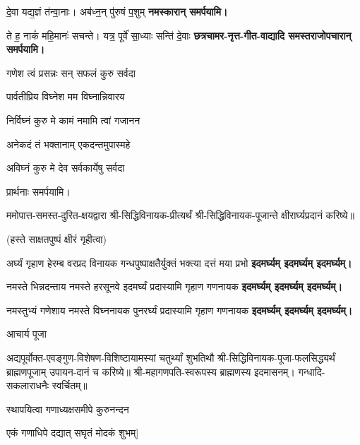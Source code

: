 \begin{center}
{दे॒वा यद्य॒ज्ञं त॑न्वा॒नाः। अब॑ध्न॒न् पु॑रुषं प॒शुम्}
\textbf{\devAya{} नमस्कारान् समर्पयामि।}
\medskip

{ते ह॒ नाकं॑ महि॒मानः॑ सचन्ते। यत्र॒ पूर्वे॑ सा॒ध्याः सन्ति॑ दे॒वाः}
\textbf{\devAya{} छत्रचामर-नृत्त-गीत-वाद्यादि समस्तराजोपचारान् समर्पयामि।}
\medskip

{गणेश त्वं प्रसन्नः सन् सफलं कुरु सर्वदा}

{पार्वतीप्रिय विघ्नेश मम विघ्नान्निवारय}

{निर्विघ्नं कुरु मे कामं नमामि त्वां गजानन}

{अनेकदं तं भक्तानाम् एकदन्तमुपास्महे}

{अविघ्नं कुरु मे देव सर्वकार्येषु सर्वदा}

प्रार्थनाः समर्पयामि।

\resetShloka
ममोपात्त-समस्त-दुरित-क्षयद्वारा श्री-सिद्धिविनायक-प्रीत्यर्थं श्री-सिद्धिविनायक-पूजान्ते क्षीरार्घ्यप्रदानं करिष्ये॥

(हस्ते साक्षतपुष्पं क्षीरं गृहीत्वा)

\twolineshloka
{अर्घ्यं गृहाण हेरम्ब वरप्रद विनायक}
{गन्धपुष्पाक्षतैर्युक्तं भक्त्या दत्तं मया प्रभो}
\textbf{\devAya{} इदमर्घ्यम् इदमर्घ्यम् इदमर्घ्यम्।}

\twolineshloka
{नमस्ते भिन्नदन्ताय नमस्ते हरसूनवे}
{इदमर्घ्यं प्रदास्यामि गृहाण गणनायक}
\textbf{\devAya{} इदमर्घ्यम् इदमर्घ्यम् इदमर्घ्यम्।}

\twolineshloka
{नमस्तुभ्यं गणेशाय नमस्ते विघ्ननायक}
{पुनरर्घ्यं प्रदास्यामि गृहाण गणनायक}
\textbf{\devAya{} इदमर्घ्यम् इदमर्घ्यम् इदमर्घ्यम्।}

\centerline{आचार्य पूजा}

अद्यपूर्वोक्त-एवङ्गुण-विशेषण-विशिष्टायामस्यां चतुर्थ्यां शुभतिथौ श्री-सिद्धिविनायक-पूजा-फलसिद्ध्यर्थं ब्राह्मणपूजाम् उपायन-दानं च करिष्ये॥
श्री-महागणपति-स्वरूपस्य ब्राह्मणस्य इदमासनम्। गन्धादि-सकलाराधनैः स्वर्चितम्॥

\twolineshloka*
{[अथैकविंशतिं गृह्य मोदकान् घृतपाचितान्}
{स्थापयित्वा गणाध्यक्षसमीपे कुरुनन्दन}

{एकं गणाधिपे दद्यात् सघृतं मोदकं शुभम्]}


\end{center}

